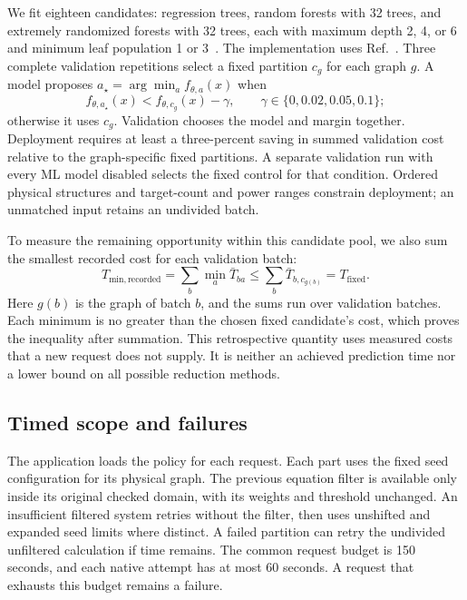 We fit eighteen candidates: regression trees, random forests with 32 trees,
and extremely randomized forests with 32 trees, each with maximum depth
2, 4, or 6 and minimum leaf population 1 or 3~\cite{CART1984,Breiman2001Forest,Geurts2006ExtraTrees}.
The implementation uses Ref.~\cite{Pedregosa2011Bounds}. Three complete
validation repetitions select a fixed partition $c_g$ for each graph $g$.
A model proposes $a_\star=\arg\min_a f_{\theta,a}(x)$ when
\begin{equation}
 f_{\theta,a_\star}(x)<f_{\theta,c_g}(x)-\gamma,
 \qquad \gamma\in\{0,0.02,0.05,0.1\};
\end{equation}
otherwise it uses $c_g$. Validation chooses the model and margin together.
Deployment requires at least a three-percent saving in summed validation
cost relative to the graph-specific fixed partitions. A separate validation
run with every ML model disabled selects the fixed control for that condition.
Ordered physical structures and target-count and power ranges constrain
deployment; an unmatched input retains an undivided batch.

To measure the remaining opportunity within this candidate pool, we also
sum the smallest recorded cost for each validation batch:
\begin{equation}
 T_{\mathrm{min,recorded}}=\sum_b\min_a\bar T_{ba}
 \leq\sum_b\bar T_{b,c_{g(b)}}=T_{\mathrm{fixed}}.
\end{equation}
Here $g(b)$ is the graph of batch $b$, and the sums run over validation
batches. Each minimum is no greater than the chosen fixed candidate's
cost, which proves the inequality after summation. This retrospective
quantity uses measured costs that a new request does not supply. It is
neither an achieved prediction time nor a lower bound on all possible
reduction methods.

\subsection{Timed scope and failures}
The application loads the policy for each request. Each part uses the fixed
seed configuration for its physical graph. The previous equation filter is
available only inside its original checked domain, with its weights and
threshold unchanged. An insufficient filtered system retries without the
filter, then uses unshifted and expanded seed limits where distinct. A failed
partition can retry the undivided unfiltered calculation if time remains.
The common request budget is 150 seconds, and each native attempt has at most
60 seconds. A request that exhausts this budget remains a failure.

